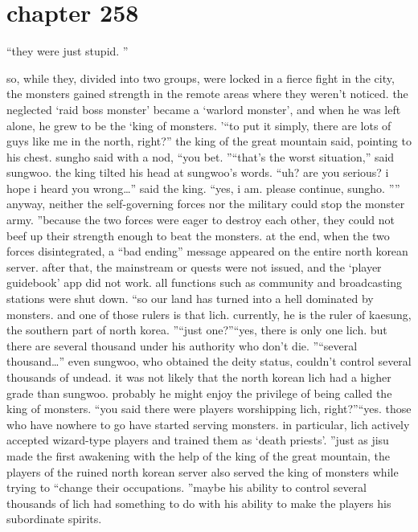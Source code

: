 \section{chapter 258}

                            “they were just stupid.
”




so, while they, divided into two groups, were locked in a fierce fight in the city, the monsters gained strength in the remote areas where they weren’t noticed.
the neglected ‘raid boss monster’ became a ‘warlord monster’, and when he was left alone, he grew to be the ‘king of monsters.
’“to put it simply, there are lots of guys like me in the north, right?” the king of the great mountain said, pointing to his chest.
sungho said with a nod, “you bet.
”“that’s the worst situation,” said sungwoo.
the king tilted his head at sungwoo’s words.
“uh? are you serious? i hope i heard you wrong…” said the king.
“yes, i am.
 please continue, sungho.
”” anyway, neither the self-governing forces nor the military could stop the monster army.
”because the two forces were eager to destroy each other, they could not beef up their strength enough to beat the monsters.
at the end, when the two forces disintegrated, a “bad ending” message appeared on the entire north korean server.
after that, the mainstream or quests were not issued, and the ‘player guidebook’ app did not work.
 all functions such as community and broadcasting stations were shut down.
“so our land has turned into a hell dominated by monsters.
 and one of those rulers is that lich.
 currently, he is the ruler of kaesung, the southern part of north korea.
”“just one?”“yes, there is only one lich.
 but there are several thousand under his authority who don’t die.
”“several thousand…”
even sungwoo, who obtained the deity status, couldn’t control several thousands of undead.
 it was not likely that the north korean lich had a higher grade than sungwoo.
 probably he might enjoy the privilege of being called the king of monsters.
“you said there were players worshipping lich, right?”“yes.
 those who have nowhere to go have started serving monsters.
 in particular, lich actively accepted wizard-type players and trained them as ‘death priests’.
”just as jisu made the first awakening with the help of the king of the great mountain, the players of the ruined north korean server also served the king of monsters while trying to “change their occupations.
”maybe his ability to control several thousands of lich had something to do with his ability to make the players his subordinate spirits.

